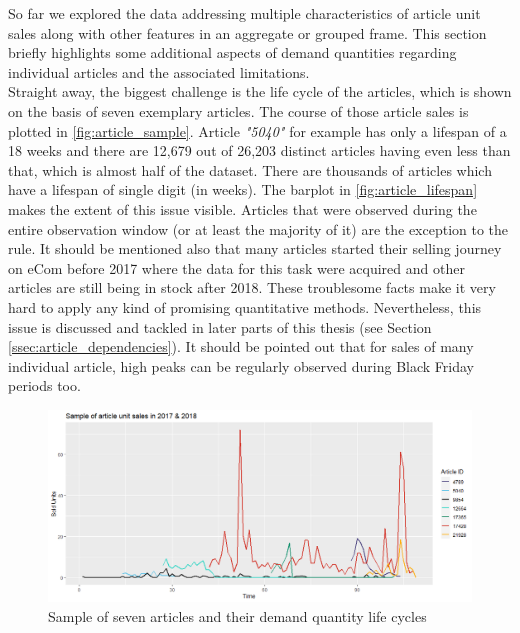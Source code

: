 

So far we explored the data addressing multiple characteristics of article unit sales along with other features in an aggregate or grouped frame. This section briefly highlights some additional aspects of demand quantities regarding individual articles and the associated limitations.
\\

Straight away, the biggest challenge is the life cycle of the articles, which is shown on the basis of seven exemplary articles. The course of those article sales is plotted in \autoref{fig:article_sample}. Article \textit{"5040"} for example has only a lifespan of a 18 weeks and there are 12,679 out of 26,203 distinct articles having even less than that, which is almost half of the dataset. There are thousands of articles which have a lifespan of single digit (in weeks). The barplot in \autoref{fig:article_lifespan} makes the extent of this issue visible. Articles that were observed during the entire observation window (or at least the majority of it) are the exception to the rule. It should be mentioned also that many articles started their selling journey on eCom before 2017 where the data for this task were acquired and other articles are still being in stock after 2018. These troublesome facts make it very hard to apply any kind of promising quantitative methods. Nevertheless, this issue is discussed and tackled in later parts of this thesis (see Section \ref{ssec:article_dependencies}). It should be pointed out that for sales of many individual article, high peaks can be regularly observed during Black Friday periods too.
\\


\begin{figure}[H]
\centering
  \includegraphics[width=0.95\linewidth]{figures/article_sample.png}
  \caption{Sample of seven articles and their demand quantity life cycles}
  \label{fig:article_sample}
\end{figure}


